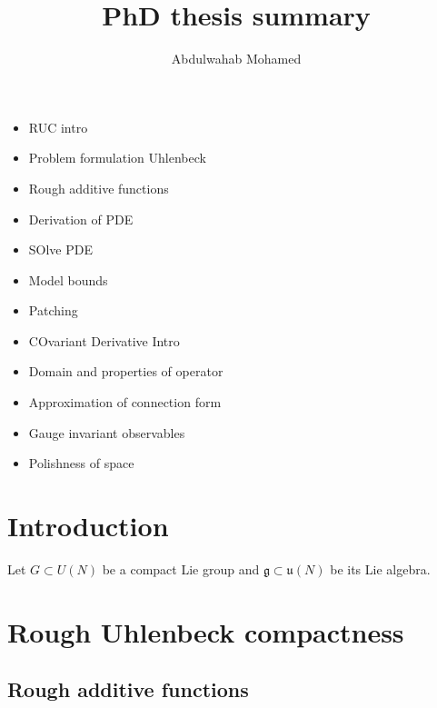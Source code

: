 \documentclass[12pt]{article}
\title{PhD thesis summary}
\author{Abdulwahab Mohamed}
\numberwithin{equation}{section}
\theoremstyle{definition}
\theoremstyle{remark}
\newcommand{\1}{\mathbf 1}
\newcommand{\<}{\langle}
\renewcommand{\>}{\rangle}
\newcommand{\fg}{\mathfrak g}
\newcommand{\fu}{\mathfrak u}
\begin{document}
\maketitle
\begin{itemize}
\item RUC intro
    \item Problem formulation Uhlenbeck
    \item Rough additive functions
    \item Derivation of PDE
    \item SOlve PDE
    \item Model bounds
    \item Patching 
    \item COvariant Derivative Intro
    \item Domain and properties of operator
    \item Approximation of connection form
    \item  Gauge invariant observables
    \item Polishness of space
\end{itemize}
\section{Introduction}
Let $G\subset U(N)$ be a compact Lie group and $\fg\subset \fu(N)$ be its Lie algebra. 

\section{Rough Uhlenbeck compactness}

\subsection{Rough additive functions}
\end{document}
